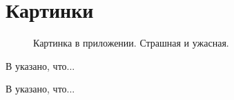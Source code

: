 \chapter{Картинки}
\label{cha:appendix1}

\begin{figure}
\centering
\caption{Картинка в приложении. Страшная и ужасная.}
\end{figure}

В \cite{Pup09} указано, что...

В \cite{Pup10} указано, что...

